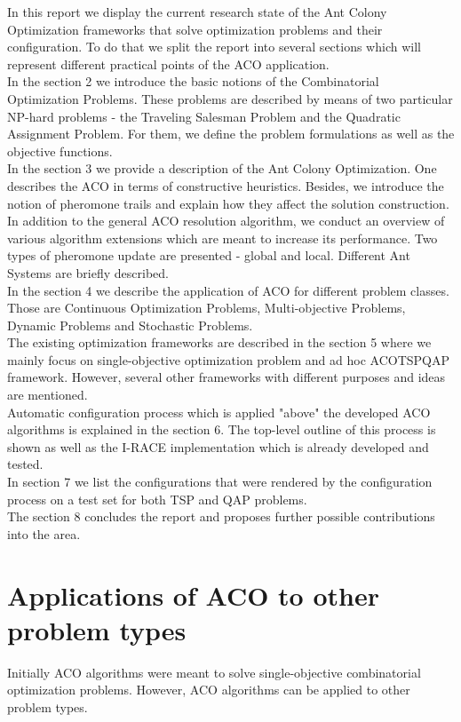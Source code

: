 \documentclass[12pt]{article}
\begin{document}
In this report we display the current research state of the Ant Colony Optimization frameworks that solve optimization problems and their configuration. To do that we split the report into several sections which will represent different practical points of the ACO application. \\
In the section 2 we introduce the basic notions of the Combinatorial Optimization Problems. These problems are described by means of two particular NP-hard problems - the  Traveling Salesman Problem and the Quadratic Assignment Problem. For them, we define the problem formulations as well as the objective functions. \\
In the section 3 we provide a description of the Ant Colony Optimization. One describes the ACO in terms of constructive heuristics. Besides, we introduce the notion of pheromone trails and explain how they affect the solution construction. In addition to the general ACO resolution algorithm, we conduct an overview of various algorithm extensions which are meant to increase its performance. Two types of pheromone update are presented - global and local. Different Ant Systems are briefly described. \\
In the section 4 we describe the application of ACO for different problem classes. Those are Continuous Optimization Problems, Multi-objective Problems, Dynamic Problems and Stochastic Problems. \\
The existing optimization frameworks are described in the section 5 where we mainly focus on single-objective optimization problem and ad hoc ACOTSPQAP framework. However, several other frameworks with different purposes and ideas are mentioned. \\
Automatic configuration process which is applied "above" the developed ACO algorithms is explained in the section 6. The top-level outline of this process is shown as well as the I-RACE implementation which is already developed and tested. \\
In section 7 we list the configurations that were rendered by the configuration process on a test set for both TSP and QAP problems. \\
The section 8 concludes the report and proposes further possible contributions into the area.




\section{Applications of ACO to other problem types}
Initially ACO algorithms were meant to solve single-objective combinatorial optimization problems. However, ACO algorithms can be applied to other problem types.
\end{document}
